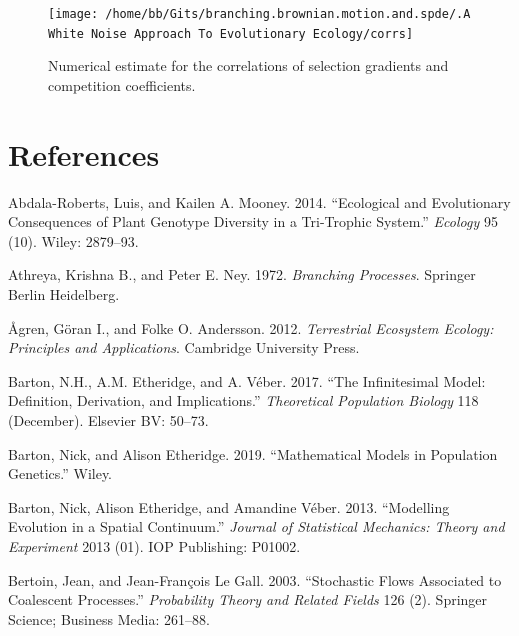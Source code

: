 \documentclass[]{article}
\begin{document}
\begin{figure}

{\centering \texttt{[image: /home/bb/Gits/branching.brownian.motion.and.spde/.A White Noise Approach To Evolutionary Ecology/corrs]} 

}

\caption{\label{num_corr} Numerical estimate for the correlations of selection gradients and competition coefficients.}\label{fig:unnamed-chunk-13}
\end{figure}

\newpage

\hypertarget{references}{%
\section*{References}\label{references}}

\hypertarget{refs}{}
\leavevmode\hypertarget{ref-AbdalaRoberts2014}{}%
Abdala-Roberts, Luis, and Kailen A. Mooney. 2014. ``Ecological and
Evolutionary Consequences of Plant Genotype Diversity in a Tri-Trophic
System.'' \emph{Ecology} 95 (10). Wiley: 2879--93.

\leavevmode\hypertarget{ref-Athreya1972}{}%
Athreya, Krishna B., and Peter E. Ney. 1972. \emph{Branching Processes}.
Springer Berlin Heidelberg.

\leavevmode\hypertarget{ref-9781107648258}{}%
Ågren, Göran I., and Folke O. Andersson. 2012. \emph{Terrestrial
Ecosystem Ecology: Principles and Applications}. Cambridge University
Press.

\leavevmode\hypertarget{ref-Barton2017}{}%
Barton, N.H., A.M. Etheridge, and A. Véber. 2017. ``The Infinitesimal
Model: Definition, Derivation, and Implications.'' \emph{Theoretical
Population Biology} 118 (December). Elsevier BV: 50--73.

\leavevmode\hypertarget{ref-Barton2019}{}%
Barton, Nick, and Alison Etheridge. 2019. ``Mathematical Models in
Population Genetics.'' Wiley.

\leavevmode\hypertarget{ref-Barton2013}{}%
Barton, Nick, Alison Etheridge, and Amandine Véber. 2013. ``Modelling
Evolution in a Spatial Continuum.'' \emph{Journal of Statistical
Mechanics: Theory and Experiment} 2013 (01). IOP Publishing: P01002.

\leavevmode\hypertarget{ref-Bertoin2003}{}%
Bertoin, Jean, and Jean-François Le Gall. 2003. ``Stochastic Flows
Associated to Coalescent Processes.'' \emph{Probability Theory and
Related Fields} 126 (2). Springer Science; Business Media: 261--88.
\end{document}
